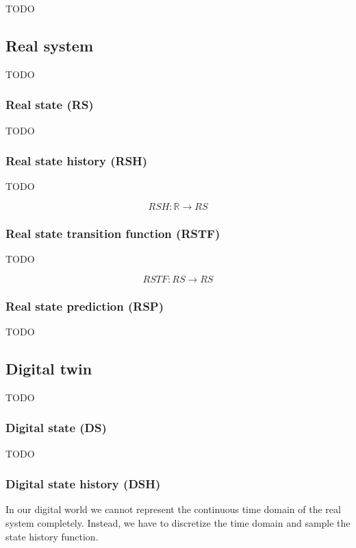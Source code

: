 \documentclass[conference]{IEEEtran}
\begin{document}
    TODO

    \subsection{Real system}

    TODO

    \subsubsection{Real state (RS)}

    TODO

    \subsubsection{Real state history (RSH)}

    TODO

    \[
        RSH: \mathbb{R} \rightarrow RS
    \]

    \subsubsection{Real state transition function (RSTF)}

    TODO

    \[
        RSTF: RS \rightarrow RS
    \]

    \subsubsection{Real state prediction (RSP)}

    TODO
    
    \subsection{Digital twin}

    TODO

    \subsubsection{Digital state (DS)}

    TODO

    \subsubsection{Digital state history (DSH)}

    In our digital world we cannot represent the continuous time domain of the real system completely.
    Instead, we have to discretize the time domain and sample the state history function.
\end{document}
